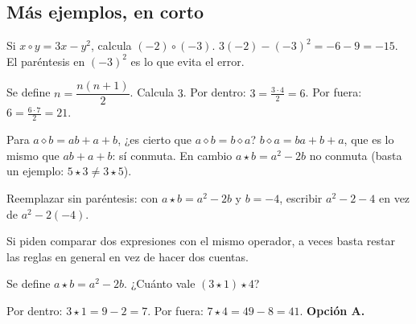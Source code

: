 \subsection{Más ejemplos, en corto}
\begin{ejemplo}
Si $x \circ y = 3x - y^2$, calcula $(-2) \circ (-3)$.
\solucion $3(-2) - (-3)^2 = -6 - 9 = -15$. El paréntesis en $(-3)^2$ es lo que evita el error.
\end{ejemplo}

\begin{ejemplo}
Se define $\boxed{n} = \dfrac{n(n + 1)}{2}$. Calcula $\boxed{\boxed{3}}$.
\solucion Por dentro: $\boxed{3} = \tfrac{3 \cdot 4}{2} = 6$. Por fuera: $\boxed{6} = \tfrac{6 \cdot 7}{2} = 21$.
\end{ejemplo}

\begin{ejemplo}[¿Conmuta?]
Para $a \diamond b = ab + a + b$, ¿es cierto que $a \diamond b = b \diamond a$?
\solucion $b \diamond a = ba + b + a$, que es lo mismo que $ab + a + b$: sí conmuta. En cambio $a \star b = a^2 - 2b$
no conmuta (basta un ejemplo: $5 \star 3 \ne 3 \star 5$).
\end{ejemplo}

\begin{trampa}
Reemplazar sin paréntesis: con $a \star b = a^2 - 2b$ y $b = -4$, escribir $a^2 - 2 - 4$ en vez de $a^2 - 2(-4)$.
\end{trampa}

\begin{atajo}
Si piden comparar dos expresiones con el mismo operador, a veces basta restar las reglas en general en vez de hacer
dos cuentas.
\end{atajo}

\begin{reto}
Se define $a \star b = a^2 - 2b$. ¿Cuánto vale $(3 \star 1) \star 4$?
\end{reto}

\begin{retoresuelto}
Por dentro: $3 \star 1 = 9 - 2 = 7$. Por fuera: $7 \star 4 = 49 - 8 = 41$. \textbf{Opción A.}
\end{retoresuelto}

